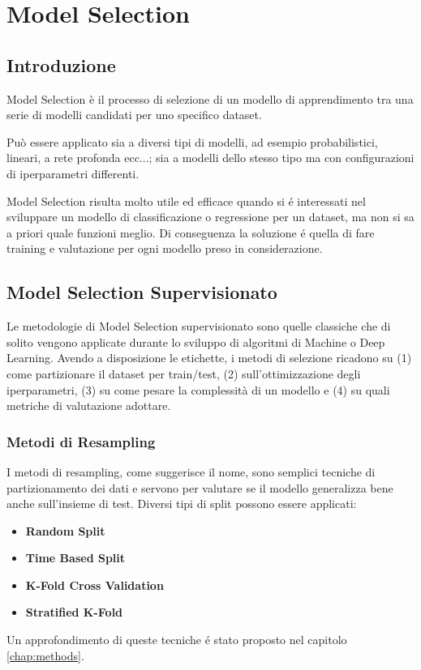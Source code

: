 \chapter{Model Selection}
\label{chap:modelselection}

\section{Introduzione}
Model Selection è il processo di selezione di un modello di apprendimento tra una serie di modelli candidati per uno specifico dataset.

Può essere applicato sia a diversi tipi di modelli, ad esempio probabilistici, lineari, a rete profonda ecc...; sia a modelli dello stesso tipo ma con configurazioni di iperparametri differenti.

Model Selection risulta molto utile ed efficace quando si é interessati nel sviluppare un modello di classificazione o regressione per un dataset, ma non si sa a priori quale funzioni meglio. Di conseguenza la soluzione é quella di fare training e valutazione per ogni modello preso in considerazione.

\section{Model Selection Supervisionato}
Le metodologie di Model Selection supervisionato sono quelle classiche che di solito vengono applicate durante lo sviluppo di algoritmi di Machine o Deep Learning. Avendo a disposizione le etichette, i metodi di selezione ricadono su (1) come partizionare il dataset per train/test, (2) sull'ottimizzazione degli iperparametri, (3) su come pesare la complessità di un modello e (4) su quali metriche di valutazione adottare.

\subsection{Metodi di Resampling}
I metodi di resampling, come suggerisce il nome, sono semplici tecniche di partizionamento dei dati e servono per valutare se il modello generalizza bene anche sull'insieme di test. Diversi tipi di split possono essere applicati:
\begin{itemize}
	\item \textbf{Random Split}
	\item \textbf{Time Based Split} 
	\item \textbf{K-Fold Cross Validation}
	\item \textbf{Stratified K-Fold}
\end{itemize}
Un approfondimento di queste tecniche é stato proposto nel capitolo \ref{chap:methods}.


